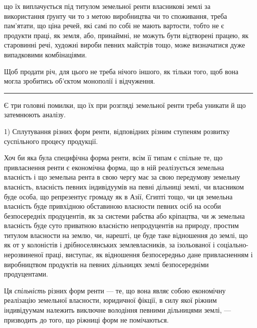 \parcont{}  %
що їх виплачується під титулом земельної ренти власникові землі за використання
ґрунту чи то з метою виробництва чи то споживання, треба пам’ятати, що
ціна речей, які самі по собі не мають вартости, тобто не є продукти праці, як
земля, або, принаймні, не можуть бути відтворені працею, як старовинні речі,
художні вироби певних майстрів тощо, може визначатися дуже випадковими
комбінаціями.

Щоб продати річ, для цього не треба нічого іншого, як тільки того, щоб
вона могла зробитись об’єктом монополії і відчуження.

\pfbreak{} %

Є три головні помилки, що їх при розгляді земельної ренти треба уникати
й що затемнюють аналізу.

1) Сплутування різних форм ренти, відповідних різним ступеням розвитку
суспільного процесу продукції.

Хоч би яка була специфічна форма ренти, всім її типам є спільне те, що привласнення
ренти є економічна форма, що в ній реалізується земельна власність і що
земельна рента в свою чергу має за свою передумову земельну власність, власність
певних індивідуумів на певні дільниці землі, чи власником буде особа, що репрезентує
громаду як в Азії, Єгипті тощо, чи ця земельна власність буде привхідною
обставиною власности певних осіб на особи безпосередніх продуцентів, як за системи
рабства або кріпацтва, чи ж земельна власність буде суто приватною
власністю непродуцентів на природу, простим титулом власности на землю, чи,
нарешті, це буде таке відношення до землі, що як от у колоністів і дрібноселянських
землевласників, за ізольованої і соціально-нерозвиненої праці, виступає,
як відношення безпосередньо дане привласненням і виробництвом продуктів
на певних дільницях землі безпосередніми продуцентами.

Ця \emph{спільність} різних форм ренти — те, що вона являє собою економічну
реалізацію земельної власности, юридичної фікції, в силу якої ріжним індивідуумам
належить виключне володіння певними дільницями землі, — призводить до
того, що ріжниці форм не помічаються.

